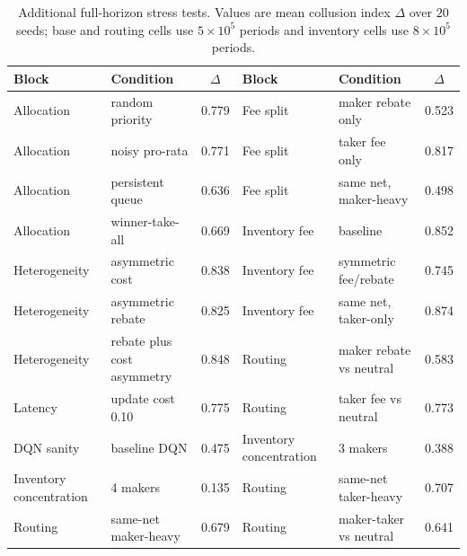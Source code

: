 \begin{table}[t]
\centering
\caption{Additional full-horizon stress tests. Values are mean collusion index $\Delta$ over $20$ seeds; base and routing cells use $5\times10^5$ periods and inventory cells use $8\times10^5$ periods.}
\label{tab:extensions-compact}
\footnotesize
\begin{tabular}{@{}llc@{\qquad}llc@{}}
\toprule
Block & Condition & $\Delta$ & Block & Condition & $\Delta$ \\
\midrule
Allocation & random priority & 0.779 & Fee split & maker rebate only & 0.523 \\
Allocation & noisy pro-rata & 0.771 & Fee split & taker fee only & 0.817 \\
Allocation & persistent queue & 0.636 & Fee split & same net, maker-heavy & 0.498 \\
Allocation & winner-take-all & 0.669 & Inventory fee & baseline & 0.852 \\
\midrule
Heterogeneity & asymmetric cost & 0.838 & Inventory fee & symmetric fee/rebate & 0.745 \\
Heterogeneity & asymmetric rebate & 0.825 & Inventory fee & same net, taker-only & 0.874 \\
Heterogeneity & rebate plus cost asymmetry & 0.848 & Routing & maker rebate vs neutral & 0.583 \\
Latency & update cost 0.10 & 0.775 & Routing & taker fee vs neutral & 0.773 \\
DQN sanity & baseline DQN & 0.475 & Inventory concentration & 3 makers & 0.388 \\
Inventory concentration & 4 makers & 0.135 & Routing & same-net taker-heavy & 0.707 \\
Routing & same-net maker-heavy & 0.679 & Routing & maker-taker vs neutral & 0.641 \\
\bottomrule
\end{tabular}
\end{table}
